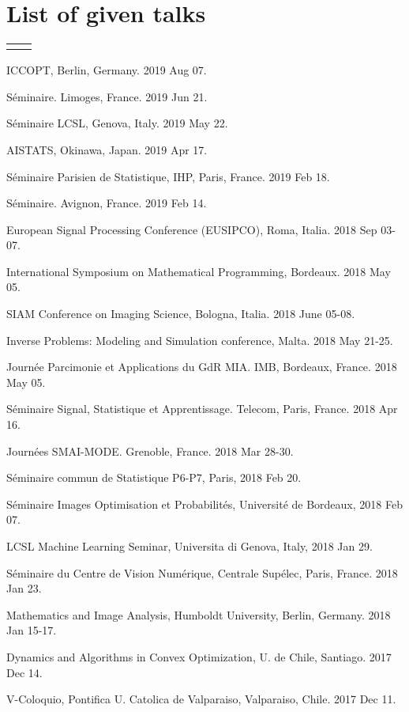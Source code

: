 \documentclass[11pt,a4paper,sans]{moderncv}        %
\makeatletter
\newcommand*{\cventrylong}[7][.25em]{%
  \begin{tabular}{@{}p{\hintscolumnwidth}@{\hspace{\separatorcolumnwidth}}p{\maincolumnwidth}@{}}%
    \raggedleft\hintstyle{#2} &{%
        {\bfseries#3}%
        \ifthenelse{\equal{#4}{}}{}{, {\slshape#4}}%
        \ifthenelse{\equal{#5}{}}{}{, #5}%
        \ifthenelse{\equal{#6}{}}{}{, #6}%
    }%
  \end{tabular}%
  {\small#7}%
  \par\addvspace{#1}}
\makeatother
\begin{document}
\section{List of given talks}
\cventrylong{}{}{}{}{}{
\begin{small}
\begin{cvitemize}
	\item ICCOPT, Berlin, Germany. 2019 Aug 07.
	\item Séminaire. Limoges, France. 2019 Jun 21.
	\item Séminaire LCSL, Genova, Italy. 2019 May 22.
	\item AISTATS, Okinawa, Japan. 2019 Apr 17.
	\item Séminaire Parisien de Statistique, IHP, Paris, France. 2019 Feb 18.
	\item Séminaire. Avignon, France. 2019 Feb 14.
	\item European Signal Processing Conference (EUSIPCO), Roma, Italia. 2018 Sep 03-07.
	\item International Symposium on Mathematical Programming,  Bordeaux. 2018 May 05.
	\item SIAM Conference on Imaging Science, Bologna, Italia. 2018 June 05-08.
	\item Inverse Problems: Modeling and Simulation conference, Malta. 2018 May 21-25.
	\item Journée Parcimonie et Applications du GdR MIA. IMB, Bordeaux, France. 2018 May 05.
	\item Séminaire Signal, Statistique et Apprentissage. Telecom, Paris, France. 2018 Apr 16.
	\item Journées SMAI-MODE. Grenoble, France. 2018 Mar 28-30.
	\item Séminaire commun de Statistique P6-P7, Paris, 2018 Feb 20.
	\item Séminaire Images Optimisation et Probabilités, Université de Bordeaux, 2018 Feb 07.
	\item LCSL Machine Learning Seminar, Universita di Genova, Italy, 2018 Jan 29.
	\item Séminaire du Centre de Vision Numérique, Centrale Supélec, Paris, France. 2018 Jan 23.
	\item Mathematics and Image Analysis, Humboldt University, Berlin, Germany. 2018 Jan 15-17.
	\item Dynamics and Algorithms in Convex Optimization, U. de Chile, Santiago. 2017 Dec 14.
	\item V-Coloquio, Pontifica U. Catolica de Valparaiso, Valparaiso, Chile. 2017 Dec 11.

\end{cvitemize}
\end{small}}
\end{document}
